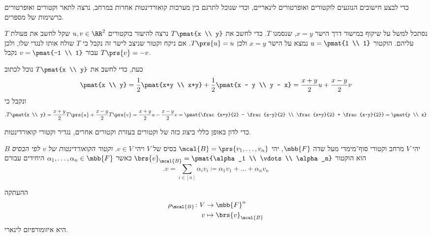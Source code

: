 \documentclass[a4paper,10pt,twoside,openany]{book}
\begin{document}
כדי לבצע חישובים הנוגעים לוקטורים ואופרטורים לינאריים, וכדי שנוכל לתרגם בין מערכות קואורדינטות אחרות במרחב, נרצה לתאר וקטורים ואופרטורים כרשימות של מספרים.

\begin{example}
נסתכל למשל על שיקוף במישור דרך הישר
$x=y$,
שנסמנו
$T$.
כדי לחשב את
$T \pmat{x \\ y}$
נרצה להיעזר בוקטורים
$u,v \in \RR^2$
שקל לחשב את פעולת
$T$
עליהם. הוקטור
$u = \pmat{1 \\ 1}$
נמצא על הישר
$x=y$
ולכן
$T\prs{u} = u$.
אם ניקח וקטור שניצב לישר זה נקבל כי
$T$
שולח אותו לנגדי שלו, ולכן עבור
$v = \pmat{-1 \\ 1}$
נקבל
$T\prs{v} = -v$.

כעת, כדי לחשב את
$T\pmat{x \\ y}$
נוכל לכתוב
\begin{align*}
\pmat{x \\ y} = \frac{1}{2} \pmat{x+y \\ x+y} + \frac{1}{2} \pmat{x - y \\ y - x} = \frac{x+y}{2} u + \frac{x-y}{2} v
\end{align*}
ונקבל כי
\begin{align*}
\text{.} T\pmat{x \\ y} = \frac{x+y}{2} T\prs{u} + \frac{x-y}{2} T\prs{v} = \frac{x+y}{2} u - \frac{x-y}{2} v = \pmat{\frac{x+y}{2} - \frac{x-y}{2} \\ \frac{x+y}{2} + \frac{x-y}{2}} = \pmat{y \\ x}
\end{align*}
\end{example}

כדי לדון באופן כללי ביצוג כזה של וקטורים בעזרת וקטורים אחרים, נגדיר וקטורי קואורדינטות.

\begin{definition}
יהי
$V$
מרחב וקטורי סוף־מימדי מעל שדה
$\mbb{F}$,
יהי
$\mcal{B} = \prs{v_1, \ldots, v_n}$
בסיס של
$V$
ויהי
$v \in V$.
\emph{וקטור הקואורדינטות של
$v$
לפי הבסיס
$B$}
הוא הוקטור
$\brs{v}_\mcal{B} = \pmat{\alpha_1 \\ \vdots \\ \alpha_n}$
כאשר
$\alpha_1, \ldots, \alpha_n \in \mbb{F}$
היחידים עבורם
\[\text{.}v = \sum_{i \in [n]} \alpha_i v_i \coloneqq \alpha_1 v_1 + \ldots + \alpha_n v_n\]
\end{definition}

\begin{remark}
ההעתקה
\begin{align*}
\rho_\mcal{B} \colon V &\to \mbb{F}^n \\
v &\mapsto \brs{v}_\mcal{B}
\end{align*}
היא איזומורפיזם לינארי.
\end{remark}
\end{document}
